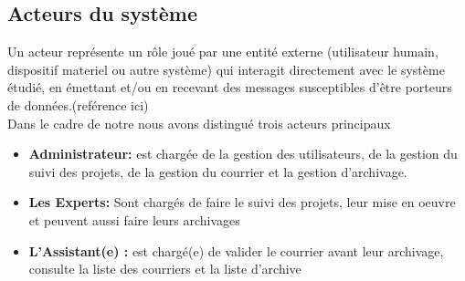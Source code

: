 \documentclass[14pt,A4,french,oneside,leqno]{report}
\begin{document}
\subsection{Acteurs du système}
 \textrm{Un acteur représente un rôle joué par une entité externe (utilisateur humain, dispositif materiel ou autre système) qui interagit directement avec le système étudié, en émettant et/ou en recevant des messages susceptibles d'être porteurs de données.(reférence ici)}\\
 \indent Dans le cadre de notre nous avons distingué trois acteurs principaux\\
 	\begin{itemize}
 	\item [\textbullet] \textbf{ Administrateur:} est chargée  de la gestion des utilisateurs, de la gestion du suivi des projets, de la gestion du courrier et la gestion d'archivage.\\
 \end{itemize}
 
 \begin{itemize}
 	\item [\textbullet] \textbf{  Les Experts:} Sont chargés de faire le suivi des projets, leur mise en oeuvre et peuvent aussi faire leurs archivages\\
 \end{itemize}
 
 \begin{itemize}
 	\item [\textbullet] \textbf{ L'Assistant(e) :}  est chargé(e) de valider le courrier avant leur archivage,  consulte la liste des courriers et la liste d'archive
 \end{itemize}
\end{document}

